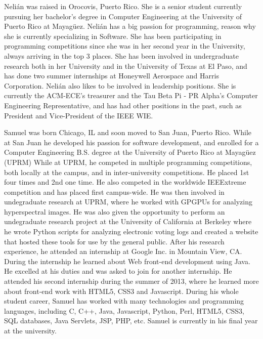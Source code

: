 \label{sec:bios}


Nelián was raised in Orocovis, Puerto Rico. She is a senior
student currently pursuing her bachelor's degree in Computer Engineering at the
University of Puerto Rico at Mayagüez. Nelián has a big passion for programming,
reason why she is currently specializing in Software. She
has been participating in programming competitions since she was in her second
year in the University, always arriving in the top 3 places. She has been involved in
undergraduate research both in her University and in the University of Texas at
El Paso,  and has done two summer internships at
Honeywell Aerospace and Harris Corporation. Nelián also likes to be
involved in leadership positions.  She is currently the ACM-ECE's treasurer and
the Tau Beta Pi - PR Alpha's Computer Engineering Representative, and has had
other positions in the past, such as President and Vice-President of the IEEE
WIE.


Samuel was born Chicago, IL and soon moved to San Juan, Puerto Rico. While at
San Juan he developed his passion for software development, and enrolled for a
Computer Engineering B.S. degree at the University of Puerto Rico at Mayagüez
(UPRM) While at UPRM, he competed in multiple programming competitions, both
locally at the campus, and in inter-university competitions. He placed 1st four
times and 2nd one time. He also competed in the worldwide IEEExtreme competition
and has placed first campus-wide. He was then involved in undegraduate research
at UPRM, where he worked with GPGPUs for analyzing hyperspectral images. He was
also given the opportunity to perform an undegraduate research project at the
University of California at Berkeley where he wrote Python scripts for analyzing
electronic voting logs and created a website that hosted these tools for use by
the general public. After his research experience, he attended an internship at
Google Inc. in Mountain View, CA. During the internship he learned about Web
front-end development using Java. He excelled at his duties and was asked to
join for another internship. He attended his second internship during the summer
of 2013, where he learned more about front-end work with HTML5, CSS3 and
Javascript. During his whole student career, Samuel has worked with many
technologies and programming languages, including C, C++, Java, Javascript,
Python, Perl, HTML5, CSS3, SQL databases, Java Servlets, JSP, PHP, etc. Samuel
is currently in his final year at the university.

